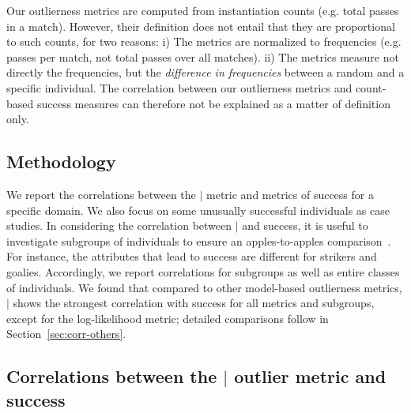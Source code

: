 {Our outlierness metrics are computed from instantiation counts (e.g. total passes in a match). However, their definition does not entail that they are proportional to such counts, for two reasons: 
i) The metrics are normalized to frequencies (e.g. passes per match, not total passes over all matches). ii) The metrics measure not directly the frequencies, but the {\em difference in frequencies} between a random and a specific individual.  The correlation between our outlierness metrics and count-based success measures can therefore not be explained as a matter of definition only.




\subsection{Methodology}

We report the correlations between the $\mid$ metric and metrics of success for a specific domain. We also focus on some unusually successful individuals as case studies. 
In considering the correlation between $\mid$ and success, it is useful to investigate subgroups of individuals to ensure an apples-to-apples comparison~\citep{Sun2009}. For instance, the attributes that lead to success are different for strikers and goalies.  Accordingly, we report correlations for subgroups as well as entire classes of individuals. We found that compared to other model-based outlierness metrics, $\mid$ shows the strongest correlation with success for all metrics and subgroups, except for the log-likelihood metric; detailed comparisons follow in Section~\ref{sec:corr-others}. 
	


\subsection{Correlations between the $\mid$ outlier metric and success}

}
